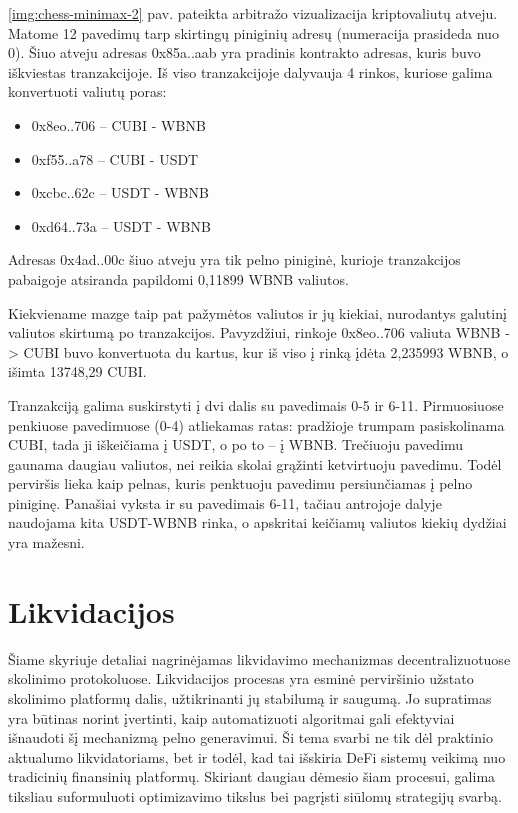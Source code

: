 \documentclass[]{VUMIFTemplateClass}
\begin{document}
\ref{img:chess-minimax-2} pav. pateikta arbitražo vizualizacija kriptovaliutų atveju. Matome 12 pavedimų tarp skirtingų piniginių adresų (numeracija prasideda nuo 0). Šiuo atveju adresas 0x85a..aab yra pradinis kontrakto adresas, kuris buvo iškviestas tranzakcijoje. Iš viso tranzakcijoje dalyvauja 4 rinkos, kuriose galima konvertuoti valiutų poras:

\begin{itemize}
    \item 0x8eo..706 -- CUBI - WBNB
    \item 0xf55..a78 -- CUBI - USDT
    \item 0xcbc..62c -- USDT - WBNB
    \item 0xd64..73a -- USDT - WBNB
\end{itemize}

Adresas 0x4ad..00c šiuo atveju yra tik pelno piniginė, kurioje tranzakcijos pabaigoje atsiranda papildomi 0,11899 WBNB valiutos.

Kiekviename mazge taip pat pažymėtos valiutos ir jų kiekiai, nurodantys galutinį valiutos skirtumą po tranzakcijos. Pavyzdžiui, rinkoje 0x8eo..706 valiuta WBNB -> CUBI buvo konvertuota du kartus, kur iš viso į rinką įdėta 2,235993 WBNB, o išimta 13748,29 CUBI.

Tranzakciją galima suskirstyti į dvi dalis su pavedimais 0-5 ir 6-11. Pirmuosiuose penkiuose pavedimuose (0-4) atliekamas ratas: pradžioje trumpam pasiskolinama CUBI, tada ji iškeičiama į USDT, o po to -- į WBNB. Trečiuoju pavedimu gaunama daugiau valiutos, nei reikia skolai grąžinti ketvirtuoju pavedimu. Todėl perviršis lieka kaip pelnas, kuris penktuoju pavedimu persiunčiamas į pelno piniginę. Panašiai vyksta ir su pavedimais 6-11, tačiau antrojoje dalyje naudojama kita USDT-WBNB rinka, o apskritai keičiamų valiutos kiekių dydžiai yra mažesni.

\section{Likvidacijos}

Šiame skyriuje detaliai nagrinėjamas likvidavimo mechanizmas decentralizuotuose skolinimo protokoluose. Likvidacijos procesas yra esminė perviršinio užstato skolinimo platformų dalis, užtikrinanti jų stabilumą ir saugumą. Jo supratimas yra būtinas norint įvertinti, kaip automatizuoti algoritmai gali efektyviai išnaudoti šį mechanizmą pelno generavimui. Ši tema svarbi ne tik dėl praktinio aktualumo likvidatoriams, bet ir todėl, kad tai išskiria DeFi sistemų veikimą nuo tradicinių finansinių platformų. Skiriant daugiau dėmesio šiam procesui, galima tiksliau suformuluoti optimizavimo tikslus bei pagrįsti siūlomų strategijų svarbą.
\end{document}
